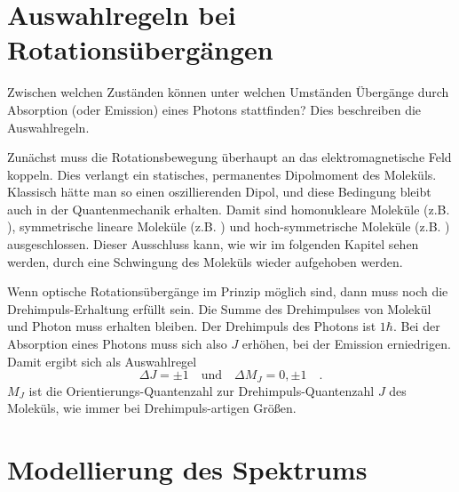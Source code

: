 \section{Auswahlregeln bei Rotationsübergängen}

Zwischen welchen Zuständen können unter welchen Umständen Übergänge durch Absorption (oder Emission) eines Photons stattfinden? Dies beschreiben  die Auswahlregeln.

Zunächst muss die Rotationsbewegung überhaupt an das elektromagnetische Feld koppeln. Dies verlangt  ein statisches, permanentes Dipolmoment des Moleküls. Klassisch hätte man so einen oszillierenden Dipol, und diese Bedingung bleibt auch in der Quantenmechanik erhalten. Damit sind homonukleare Moleküle (z.B. ), symmetrische lineare Moleküle (z.B. ) und hoch-symmetrische Moleküle (z.B. ) ausgeschlossen. Dieser Ausschluss kann, wie wir im folgenden Kapitel sehen werden, durch eine Schwingung des Moleküls wieder aufgehoben werden.

Wenn optische Rotationsübergänge im Prinzip möglich sind, dann muss noch die Drehimpuls-Erhaltung erfüllt sein. Die Summe des Drehimpulses von Molekül und Photon muss erhalten bleiben. Der Drehimpuls des Photons ist $1 \hbar$. Bei der Absorption eines Photons muss sich also $J$ erhöhen, bei der Emission erniedrigen. Damit ergibt sich als Auswahlregel
\begin{equation}
\Delta J = \pm 1 \quad \text{und} \quad \Delta M_J = 0, \pm 1 \quad .
\end{equation}
$M_J$ ist die Orientierungs-Quantenzahl zur Drehimpuls-Quantenzahl $J$ des Moleküls, wie immer bei Drehimpuls-artigen Größen.

\section{Modellierung des Spektrums}

\begin{marginfigure}
\caption{Skizze Zustände und Übergange.}
\end{marginfigure}


